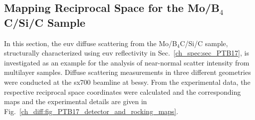 \subsection{Mapping Reciprocal Space for the Mo/B$_4$C/Si/C Sample}
In this section, the \gls{euv} diffuse scattering from the Mo/B$_4$C/Si/C sample, structurally characterized using \gls{euv} reflectivity in Sec.~\ref{ch_spec:sec_PTB17}, is investigated as an example for the analysis of near-normal scatter intensity from multilayer samples. Diffuse scattering measurements in three different geometries were conducted at the \gls{sx700} beamline at \gls{bessy}. From the experimental data, the respective reciprocal space coordinates were calculated and the corresponding maps and the experimental details are given in Fig.~\ref{ch_diff:fig_PTB17_detector_and_rocking_maps}.
\begin{figure}[htbp]

\end{figure}
